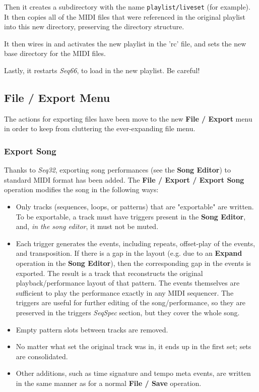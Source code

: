    Then it creates a subdirectory with the name
   \texttt{playlist/liveset} (for example).
   It then copies all of the MIDI files that were referenced in the
   original playlist into this new directory, preserving
   the directory structure.

   It then wires in and activates the new playlist in the
   'rc' file, and sets the new base directory for the MIDI files.

   Lastly, it restarts \textsl{Seq66}, to load in the new playlist.
   Be careful!

\subsection{File / Export Menu}
\label{subsec:midi_export_file_export_menu}

   The actions for exporting files have been move to the new
   \textbf{File / Export} menu in order to keep from cluttering the
   ever-expanding file menu.

\subsubsection{Export Song}
\label{subsubsec:midi_export_song_export}

   Thanks to \textsl{Seq32}, exporting song performances (see the
   \textbf{Song Editor}) to standard MIDI format has been added.
   The \textbf{File / Export / Export Song} operation modifies the song in the
   following ways:

   \begin{itemize}
      \item Only tracks (sequences, loops, or patterns)
         that are "exportable" are written.  To be exportable, a
         track must have triggers present
         in the \textbf{Song Editor}, and, \textsl{in the song editor}, it
         must not be muted.
      \item Each trigger generates the events, including repeats,
         offset-play of the events, and transposition.
         If there is a gap in the layout
         (e.g. due to an \textbf{Expand} operation in the
         \textbf{Song Editor}),
         then the corresponding gap in the events is exported.
         The result is a track that reconstructs the original
         playback/performance layout of that pattern.
         The events themselves are sufficient to play the performance exactly
         in any MIDI sequencer.
         The triggers are useful for further editing of the song/performance,
         so they are preserved in the triggers \textsl{SeqSpec} section, but
         they cover the whole song.
      \item Empty pattern slots between tracks are removed.
      \item No matter what set the original track was in, it ends up in the
         first set; sets are consolidated.
      \item Other additions, such as time signature and tempo meta events, are
         written in the same manner as for a normal \textbf{File / Save}
         operation.
   \end{itemize}


